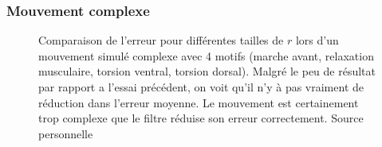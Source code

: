
\subsubsection{Mouvement complexe} %
\label{ssub:Mouvement complexe}

\begin{figure}[h]
   \begin{center}
   \end{center}
   \caption[Comparaison de l'erreur pour différents $r$ lors d'un mouvement 
   simulé complexe]{Comparaison de l'erreur pour différentes tailles de $r$ lors
   d'un mouvement simulé complexe avec 4 motifs (marche avant, relaxation musculaire,
   torsion ventral, torsion dorsal). Malgré le peu de résultat par rapport a l'essai
   précédent, on voit qu'il n'y à pas vraiment de réduction dans l'erreur moyenne. Le
   mouvement est certainement trop complexe que le filtre réduise son erreur correctement.
   Source personnelle}
   \label{fig:comparaison_r_mouvement_complexe}
\end{figure}

\begin{figure}[h]
   \begin{center}
   \end{center}
   \caption[]{}
   \label{fig:comparaison_r_mouvement_complexe_2}
\end{figure}




